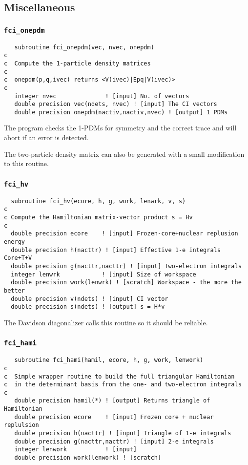 \subsection{Miscellaneous}

\subsubsection{{\tt fci\_onepdm}}
\begin{verbatim}
   subroutine fci_onepdm(vec, nvec, onepdm)
c  
c  Compute the 1-particle density matrices
c  
c  onepdm(p,q,ivec) returns <V(ivec)|Epq|V(ivec)>
c  
   integer nvec              ! [input] No. of vectors
   double precision vec(ndets, nvec) ! [input] The CI vectors
   double precision onepdm(nactiv,nactiv,nvec) ! [output] 1 PDMs
\end{verbatim}

The program checks the 1-PDMs for symmetry and the correct trace and
will abort if an error is detected.

The two-particle density matrix can also be generated with a small
modification to this routine.

\subsubsection{{\tt fci\_hv}}
\begin{verbatim}
  subroutine fci_hv(ecore, h, g, work, lenwrk, v, s)
c
c Compute the Hamiltonian matrix-vector product s = Hv 
c
  double precision ecore    ! [input] Frozen-core+nuclear replusion energy
  double precision h(nacttr) ! [input] Effective 1-e integrals Core+T+V
  double precision g(nacttr,nacttr) ! [input] Two-electron integrals
  integer lenwrk            ! [input] Size of workspace
  double precision work(lenwrk) ! [scratch] Workspace - the more the better
  double precision v(ndets) ! [input] CI vector
  double precision s(ndets) ! [output] s = H*v
\end{verbatim}

The Davidson diagonalizer calls this routine so it should be reliable.

\subsubsection{{\tt fci\_hami}}
\begin{verbatim}
   subroutine fci_hami(hamil, ecore, h, g, work, lenwork)
c
c  Simple wrapper routine to build the full triangular Hamiltonian
c  in the determinant basis from the one- and two-electron integrals
c
   double precision hamil(*) ! [output] Returns triangle of Hamiltonian
   double precision ecore    ! [input] Frozen core + nuclear replulsion
   double precision h(nacttr) ! [input] Triangle of 1-e integrals
   double precision g(nacttr,nacttr) ! [input] 2-e integrals
   integer lenwork           ! [input]
   double precision work(lenwork) ! [scratch]
\end{verbatim}


